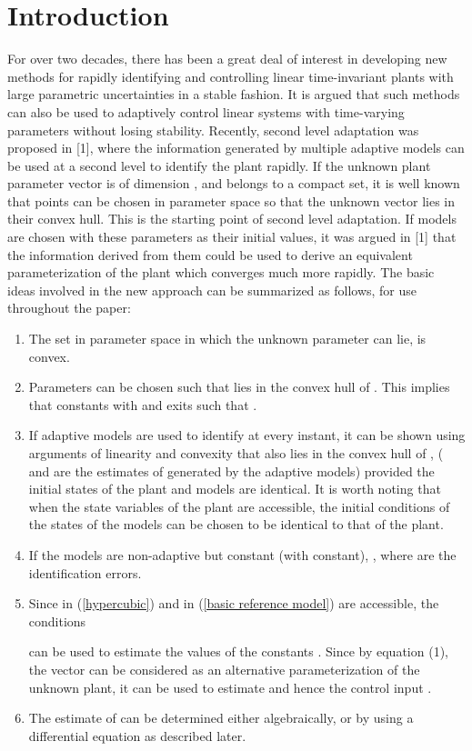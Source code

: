 \documentclass[conference]{IEEEtran}
\begin{document}
\section{Introduction}
For over two decades, there has been a great deal of interest in developing new methods for rapidly identifying and controlling linear time-invariant plants with large parametric uncertainties in a stable fashion. It is argued that such methods can also be used to adaptively control linear systems with time-varying parameters without losing stability. Recently, second level adaptation was proposed in [1], where the information generated by multiple adaptive models can be used at a second level to identify the plant rapidly. If the unknown plant parameter vector is of dimension , and belongs to a compact set, it is well known that  points can be chosen in parameter space so that the unknown vector lies in their convex hull. This is the starting point of second level adaptation. If  models are chosen with these parameters as their initial values, it was argued in [1] that the information derived from them could be used to derive an equivalent parameterization of the plant which converges much more rapidly. The basic ideas involved in the new  approach can be summarized as follows, for use throughout the paper:
\begin{enumerate}
\item The set  in parameter space in which the unknown parameter  can lie, is convex.
\item Parameters  can be chosen such that   lies in the convex hull of . This implies that constants  with  and  exits such that .
\item If  adaptive models are used to identify  at every instant, it can be shown using arguments of linearity and convexity that  also lies in the convex  hull of , ( and  are the estimates of  generated by the adaptive models) provided the initial states of the plant and models are identical. It is worth noting that when the state variables of the plant are accessible, the initial conditions of the states of the models can be chosen to be identical to that of the plant.
\item If the  models are non-adaptive but constant (with  constant), , where  are the  identification errors.
\item Since  in (\ref{hypercubic}) and  in (\ref{basic reference model}) are accessible, the conditions

can be used to estimate the values of the constants . Since by equation (1), the vector  can be considered as an alternative parameterization of the unknown plant, it can be used to estimate  and hence the control input .
\item The estimate  of  can be determined either algebraically, or by using a differential equation as described later.
\end{enumerate}
\end{document}
